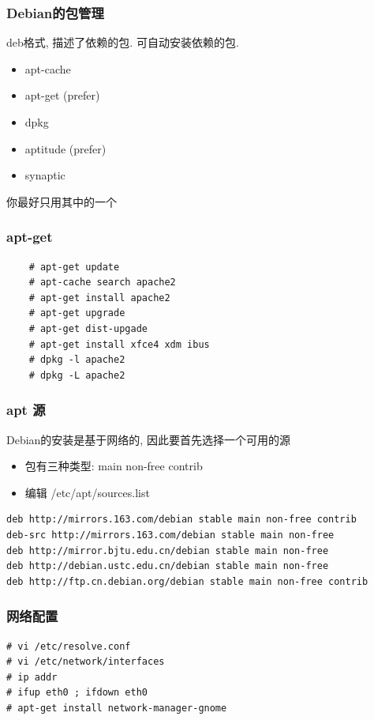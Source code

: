 \documentclass[compress]{beamer}
\begin{document}
\begin{frame}
    \frametitle{Debian的包管理}
    \noindent deb格式, 描述了依赖的包. 可自动安装依赖的包.
    \begin{itemize}
        \item apt-cache
        \item apt-get  (prefer)
        \item dpkg
        \item aptitude (prefer) 
        \item synaptic
\end{itemize}
\noindent 你最好只用其中的一个
\end{frame}

\begin{frame}[containsverbatim]
    \frametitle{apt-get}
\begin{Verbatim}
    # apt-get update
    # apt-cache search apache2
    # apt-get install apache2
    # apt-get upgrade
    # apt-get dist-upgade
    # apt-get install xfce4 xdm ibus
    # dpkg -l apache2
    # dpkg -L apache2
\end{Verbatim}
\end{frame}

\begin{frame}[containsverbatim]
    \frametitle{apt 源}
    \noindent Debian的安装是基于网络的, 因此要首先选择一个可用的源
    \begin{itemize}
        \item 包有三种类型: main non-free contrib
        \item 编辑 /etc/apt/sources.list
    \end{itemize}
\begin{Verbatim}[fontsize=\footnotesize]
deb http://mirrors.163.com/debian stable main non-free contrib 
deb-src http://mirrors.163.com/debian stable main non-free 
deb http://mirror.bjtu.edu.cn/debian stable main non-free 
deb http://debian.ustc.edu.cn/debian stable main non-free
deb http://ftp.cn.debian.org/debian stable main non-free contrib
\end{Verbatim}

\end{frame}

\begin{frame}[containsverbatim]
    \frametitle{网络配置}
\begin{Verbatim}[fontsize=\footnotesize]
# vi /etc/resolve.conf
# vi /etc/network/interfaces
# ip addr
# ifup eth0 ; ifdown eth0
# apt-get install network-manager-gnome
\end{Verbatim}
\end{frame}
\end{document}
